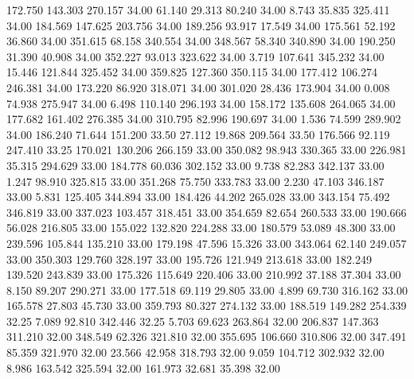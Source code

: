  172.750  143.303  270.157        34.00
  61.140   29.313   80.240        34.00
   8.743   35.835  325.411        34.00
 184.569  147.625  203.756        34.00
 189.256   93.917   17.549        34.00
 175.561   52.192   36.860        34.00
 351.615   68.158  340.554        34.00
 348.567   58.340  340.890        34.00
 190.250   31.390   40.908        34.00
 352.227   93.013  323.622        34.00
   3.719  107.641  345.232        34.00
  15.446  121.844  325.452        34.00
 359.825  127.360  350.115        34.00
 177.412  106.274  246.381        34.00
 173.220   86.920  318.071        34.00
 301.020   28.436  173.904        34.00
   0.008   74.938  275.947        34.00
   6.498  110.140  296.193        34.00
 158.172  135.608  264.065        34.00
 177.682  161.402  276.385        34.00
 310.795   82.996  190.697        34.00
   1.536   74.599  289.902        34.00
 186.240   71.644  151.200        33.50
  27.112   19.868  209.564        33.50
 176.566   92.119  247.410        33.25
 170.021  130.206  266.159        33.00
 350.082   98.943  330.365        33.00
 226.981   35.315  294.629        33.00
 184.778   60.036  302.152        33.00
   9.738   82.283  342.137        33.00
   1.247   98.910  325.815        33.00
 351.268   75.750  333.783        33.00
   2.230   47.103  346.187        33.00
   5.831  125.405  344.894        33.00
 184.426   44.202  265.028        33.00
 343.154   75.492  346.819        33.00
 337.023  103.457  318.451        33.00
 354.659   82.654  260.533        33.00
 190.666   56.028  216.805        33.00
 155.022  132.820  224.288        33.00
 180.579   53.089   48.300        33.00
 239.596  105.844  135.210        33.00
 179.198   47.596   15.326        33.00
 343.064   62.140  249.057        33.00
 350.303  129.760  328.197        33.00
 195.726  121.949  213.618        33.00
 182.249  139.520  243.839        33.00
 175.326  115.649  220.406        33.00
 210.992   37.188   37.304        33.00
   8.150   89.207  290.271        33.00
 177.518   69.119   29.805        33.00
   4.899   69.730  316.162        33.00
 165.578   27.803   45.730        33.00
 359.793   80.327  274.132        33.00
 188.519  149.282  254.339        32.25
   7.089   92.810  342.446        32.25
   5.703   69.623  263.864        32.00
 206.837  147.363  311.210        32.00
 348.549   62.326  321.810        32.00
 355.695  106.660  310.806        32.00
 347.491   85.359  321.970        32.00
  23.566   42.958  318.793        32.00
   9.059  104.712  302.932        32.00
   8.986  163.542  325.594        32.00
 161.973   32.681   35.398        32.00
